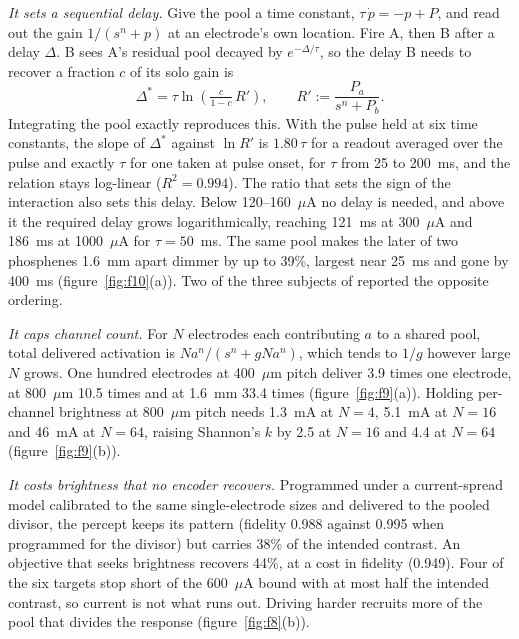 \documentclass[10pt,twocolumn]{article}
\newcommand{\um}{\ensuremath{\mu\text{m}}}
\newcommand{\uA}{\ensuremath{\mu\text{A}}}
\begin{document}
\textit{It sets a sequential delay.} Give the pool a time constant,
$\tau\,\dot p = -p + P$, and read out the gain $1/(s^n + p)$ at an
electrode's own location. Fire A, then B after a delay $\Delta$. B sees
A's residual pool decayed by $e^{-\Delta/\tau}$, so the delay B needs to
recover a fraction $c$ of its solo gain is
\begin{equation}
  \Delta^{*} = \tau \ln\!\left(\tfrac{c}{1-c}\,R'\right),
  \qquad R' := \frac{P_a}{s^n + P_b}.
  \label{eq:delay}
\end{equation}
Integrating the pool exactly reproduces this. With the pulse held at six
time constants, the slope of $\Delta^{*}$ against $\ln R'$ is
$1.80\,\tau$ for a readout averaged over the pulse and exactly $\tau$ for
one taken at pulse onset, for $\tau$ from 25 to 200~ms, and the relation
stays log-linear ($R^2 = 0.994$). The ratio that sets the sign of the
interaction also sets this delay. Below 120--160~\uA{} no delay is needed,
and above it the required delay grows logarithmically, reaching 121~ms at
300~\uA{} and 186~ms at 1000~\uA{} for $\tau = 50$~ms. The same pool
makes the later of two phosphenes 1.6~mm apart dimmer by up to 39\%,
largest near 25~ms and gone by 400~ms (figure~\ref{fig:f10}(a)). Two of the
three subjects of \citet{armentasalas2022} reported the opposite ordering.

\textit{It caps channel count.} For $N$ electrodes each contributing $a$
to a shared pool, total delivered activation is
$N a^n / (s^n + g N a^n)$, which tends to $1/g$ however large $N$ grows.
One hundred electrodes at 400~\um{} pitch deliver 3.9 times one
electrode, at 800~\um{} 10.5 times and at 1.6~mm 33.4 times
(figure~\ref{fig:f9}(a)). Holding per-channel brightness at 800~\um{}
pitch needs 1.3~mA at $N=4$, 5.1~mA at $N=16$ and 46~mA at $N=64$,
raising Shannon's $k$ by 2.5 at $N=16$ and 4.4 at $N=64$
(figure~\ref{fig:f9}(b)).

\textit{It costs brightness that no encoder recovers.} Programmed under a
current-spread model calibrated to the same single-electrode sizes and
delivered to the pooled divisor, the percept keeps its pattern (fidelity
0.988 against 0.995 when programmed for the divisor) but carries 38\% of
the intended contrast. An objective that seeks brightness recovers 44\%,
at a cost in fidelity (0.949). Four of the six targets stop short of the
600~\uA{} bound with at most half the intended contrast, so current is not
what runs out. Driving harder recruits more of the pool that divides the
response (figure~\ref{fig:f8}(b)).
\end{document}
